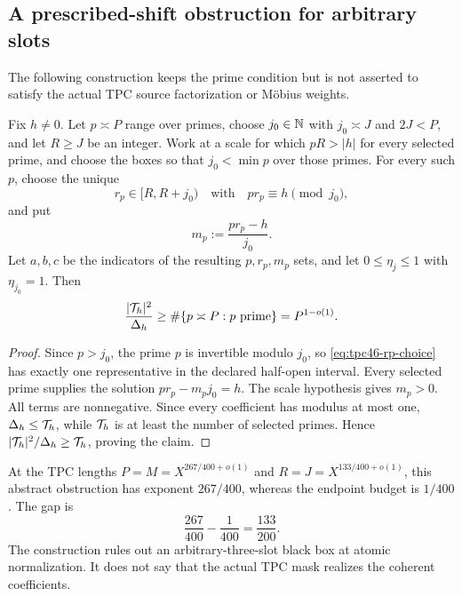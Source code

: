 \subsection{A prescribed-shift obstruction for arbitrary slots}

The following construction keeps the prime condition but is not
asserted to satisfy the actual TPC source factorization or M\"obius
weights.

\begin{proposition}
\label{prop:tpc46-fixed-shift-box}
Fix \(h\ne0\).  Let \(p\asymp P\) range over primes, choose
\(j_0\in\mathbb N\) with \(j_0\asymp J\) and \(2J<P\), and let
\(R\ge J\) be an integer.  Work at a scale for which \(pR>|h|\) for
every selected prime, and choose the boxes so that
\(j_0<\min p\) over those primes.  For every
such \(p\), choose the unique
\begin{equation}
 r_p\in[R,R+j_0)
 \quad\text{with}\quad
 pr_p\equiv h\pmod{j_0},
 \label{eq:tpc46-rp-choice}
\end{equation}
and put
\begin{equation}
 m_p:=\frac{pr_p-h}{j_0}.
 \label{eq:tpc46-mp-choice}
\end{equation}
Let \(a,b,c\) be the indicators of the resulting \(p,r_p,m_p\) sets,
and let \(0\le\eta_j\le1\) with \(\eta_{j_0}=1\).  Then
\begin{equation}
 \frac{|\mathcal T_h|^2}{\Delta_h}
 \ge \#\{p\asymp P:p\text{ prime}\}
 =P^{1-o(1)}.
 \label{eq:tpc46-fixed-shift-obstruction}
\end{equation}
\end{proposition}

\begin{proof}
Since \(p>j_0\), the prime \(p\) is invertible modulo \(j_0\), so
\eqref{eq:tpc46-rp-choice} has exactly one representative in the
declared half-open interval.  Every selected prime supplies the
solution
\(
 pr_p-m_pj_0=h
\).
The scale hypothesis gives \(m_p>0\).
All terms are nonnegative.  Since every coefficient has modulus at most
one, \(\Delta_h\le\mathcal T_h\), while \(\mathcal T_h\) is at least the number of
selected primes.  Hence
\(
 |\mathcal T_h|^2/\Delta_h\ge\mathcal T_h
\), proving the claim.
\end{proof}

At the TPC lengths
\(
 P=M=X^{267/400+o(1)}
\)
and
\(
 R=J=X^{133/400+o(1)}
\), this abstract obstruction has exponent \(267/400\), whereas the
endpoint budget is \(1/400\).  The gap is
\begin{equation}
 \frac{267}{400}-\frac1{400}
 =\frac{133}{200}.
 \label{eq:tpc46-fixed-box-gap}
\end{equation}
The construction rules out an arbitrary-three-slot black box at atomic
normalization.  It does not say that the actual TPC mask realizes the
coherent coefficients.

